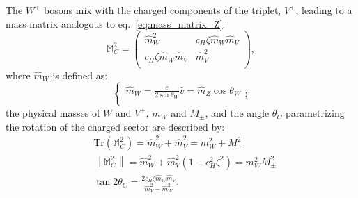 The $W^{\pm}$ bosons mix with the charged components of the triplet, $V^{\pm}$, leading to a mass matrix analogous to eq.~\ref{eq:mass_matrix_Z}:
\begin{equation}
\mathbb{M}_C^2 =
\begin{pmatrix}
\hat{m}_W^2 & c_H \zeta \hat{m}_W \hat{m}_V \\
c_H \zeta \hat{m}_W \hat{m}_V & \hat{m}_V^2 \\
\end{pmatrix}
,
\label{eq:mass_matrix_Z}
\end{equation}
where $\hat{m}_W$ is defined as:
\begin{equation}
\left\{
\begin{array}{l}
\hat{m}_W = \frac{e}{2 \sin{\theta_W}} \hat{v} = \hat{m}_Z \cos{\theta_W} \\
\end{array};
\right.
\label{eq:mass_matrix_param_W}
\end{equation}
the physical masses of $W$ and $V^{\pm}$, $m_W$ and $M_{\pm}$, and the angle $\theta_C$ parametrizing the rotation of the charged sector are described by:
\begin{equation}
\begin{split}
 & \mbox{Tr}\left( \mathbb{M}_C^2 \right) = \hat{m}_W^2 + \hat{m}_V^2 = m_W^2 + M_{\pm}^2\\
 & \left\| \mathbb{M}_C^2 \right\| = \hat{m}_W^2 + \hat{m}_V^2 \left( 1 - c_H^2 {\zeta}^2\right) = m_W^2 M_{\pm}^2 \\
 & \tan{2 \theta_C} = \frac{2 c_H \zeta \hat{m}_W \hat{m}_V}{\hat{m}_V^2 - \hat{m}_W^2}.
\end{split}
\label{eq:mass_eig_W}
\end{equation}


